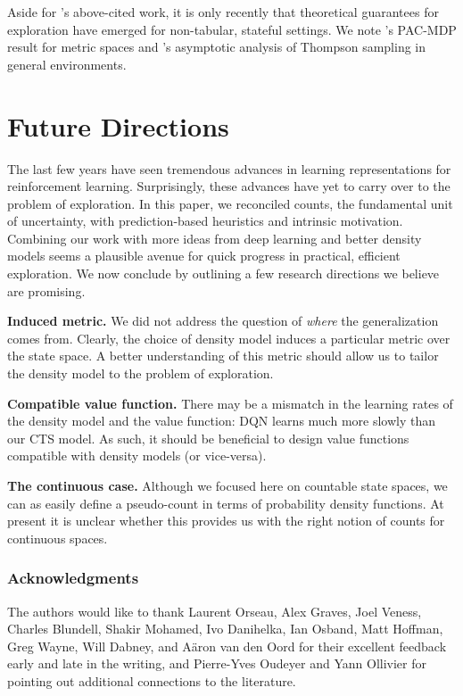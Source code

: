 \documentclass{article}
\newcommand{\highlight}[1]{\noindent \textbf{#1}}
\begin{document}
Aside for \citeauthor{orseau13universal}'s above-cited work, it is only recently that theoretical guarantees for exploration have emerged for non-tabular, stateful settings. We note \citet{pazis16efficient}'s PAC-MDP result for metric spaces and \citet{leike16thompson}'s asymptotic analysis of Thompson sampling in general environments.

\section{Future Directions}\label{sec:conclusion}

The last few years have seen tremendous advances in learning representations for 
reinforcement learning. Surprisingly, these advances have yet to carry over to 
the problem of exploration. In this paper, we reconciled counts, the fundamental unit of
uncertainty, with prediction-based heuristics and intrinsic motivation. 
Combining our work with more ideas from deep learning and better density models seems a plausible avenue for quick progress in practical, efficient exploration.
We now conclude by outlining a few research directions we believe are promising.

\highlight{Induced metric.} We did not address the question of \emph{where} the generalization comes from. Clearly, the choice of density model induces a particular metric over the state space. A better understanding of this metric should allow us to tailor the density model to the problem of exploration. 

\highlight{Compatible value function.} There may be a mismatch in the learning rates of the density model and the value function: DQN learns much more slowly than our
CTS model. As such, it should be beneficial to design value functions
compatible with density models (or vice-versa). 

\highlight{The continuous case.} Although we focused here on countable state spaces, we can as easily define a pseudo-count in terms of probability density functions. 
At present it is unclear whether this provides us with the right notion of counts for continuous spaces. 

\subsubsection*{Acknowledgments}

The authors would like to thank Laurent Orseau, Alex Graves, Joel Veness, Charles Blundell, Shakir Mohamed, Ivo Danihelka, Ian Osband, Matt Hoffman, Greg Wayne, Will Dabney, and A\"aron van den Oord for their excellent feedback early and late in the writing, and Pierre-Yves Oudeyer and Yann Ollivier for pointing out additional connections to the literature. 
\end{document}
